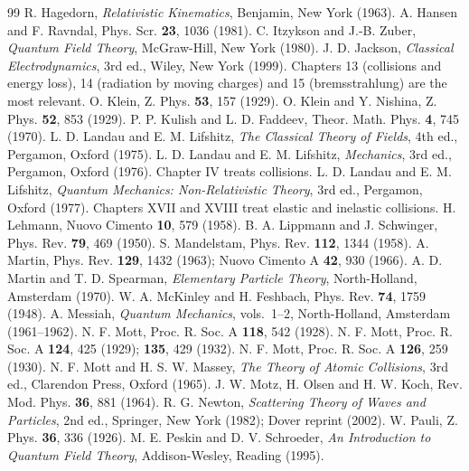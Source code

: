 \documentclass[11pt,a4paper]{book}
\numberwithin{equation}{chapter}
\begin{document}
\begin{thebibliography}{99}
 R. Hagedorn, \emph{Relativistic Kinematics}, Benjamin, New York (1963).
 A. Hansen and F. Ravndal, Phys. Scr. \textbf{23}, 1036 (1981).
 C. Itzykson and J.-B. Zuber, \emph{Quantum Field Theory}, McGraw-Hill, New York (1980).
 J. D. Jackson, \emph{Classical Electrodynamics}, 3rd ed., Wiley, New York (1999). Chapters 13 (collisions and energy loss), 14 (radiation by moving charges) and 15 (bremsstrahlung) are the most relevant.
 O. Klein, Z. Phys. \textbf{53}, 157 (1929).
 O. Klein and Y. Nishina, Z. Phys. \textbf{52}, 853 (1929).
 P. P. Kulish and L. D. Faddeev, Theor. Math. Phys. \textbf{4}, 745 (1970).
 L. D. Landau and E. M. Lifshitz, \emph{The Classical Theory of Fields}, 4th ed., Pergamon, Oxford (1975).
 L. D. Landau and E. M. Lifshitz, \emph{Mechanics}, 3rd ed., Pergamon, Oxford (1976). Chapter IV treats collisions.
 L. D. Landau and E. M. Lifshitz, \emph{Quantum Mechanics: Non-Relativistic Theory}, 3rd ed., Pergamon, Oxford (1977). Chapters XVII and XVIII treat elastic and inelastic collisions.
 H. Lehmann, Nuovo Cimento \textbf{10}, 579 (1958).
 B. A. Lippmann and J. Schwinger, Phys. Rev. \textbf{79}, 469 (1950).
 S. Mandelstam, Phys. Rev. \textbf{112}, 1344 (1958).
 A. Martin, Phys. Rev. \textbf{129}, 1432 (1963); Nuovo Cimento A \textbf{42}, 930 (1966).
 A. D. Martin and T. D. Spearman, \emph{Elementary Particle Theory}, North-Holland, Amsterdam (1970).
 W. A. McKinley and H. Feshbach, Phys. Rev. \textbf{74}, 1759 (1948).
 A. Messiah, \emph{Quantum Mechanics}, vols.~1--2, North-Holland, Amsterdam (1961--1962).
 N. F. Mott, Proc. R. Soc. A \textbf{118}, 542 (1928).
 N. F. Mott, Proc. R. Soc. A \textbf{124}, 425 (1929); \textbf{135}, 429 (1932).
 N. F. Mott, Proc. R. Soc. A \textbf{126}, 259 (1930).
 N. F. Mott and H. S. W. Massey, \emph{The Theory of Atomic Collisions}, 3rd ed., Clarendon Press, Oxford (1965).
 J. W. Motz, H. Olsen and H. W. Koch, Rev. Mod. Phys. \textbf{36}, 881 (1964).
 R. G. Newton, \emph{Scattering Theory of Waves and Particles}, 2nd ed., Springer, New York (1982); Dover reprint (2002).
 W. Pauli, Z. Phys. \textbf{36}, 336 (1926).
 M. E. Peskin and D. V. Schroeder, \emph{An Introduction to Quantum Field Theory}, Addison-Wesley, Reading (1995).

\end{thebibliography}
\end{document}
